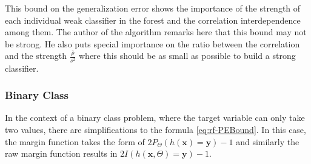 %
%
%
%
%
%
%
%


This bound on the generalization error shows the importance of the strength of each individual weak classifier in the forest and the correlation interdependence among them. The author of the algorithm \cite{breiman-randomforests} remarks here that this bound may not be strong. He also puts special importance on the ratio between the correlation and the strength $\frac{\overline{\rho}}{s^2}$ where this should be as small as possible to build a strong classifier.
\subsubsection{Binary Class}
In the context of a binary class problem, where the target variable can only take two values, there are simplifications to the formula \ref{eq:rf-PEBound}. In this case, the margin function takes the form of $2 P_{\Theta}(h(\textbf{x}) = \textbf{y}) -1$ and similarly the raw margin function results in $2 I(h(\textbf{x}, \Theta) = \textbf{y}) -1$.


